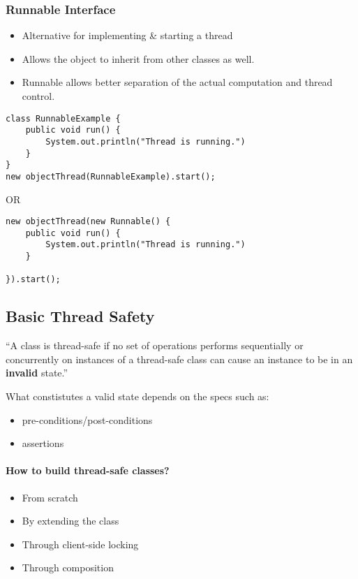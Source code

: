 \documentclass[a4paper]{article}
\begin{document}
\subsubsection{Runnable Interface}
\begin{itemize}
	\item Alternative for implementing \& starting a thread
	\item Allows the object to inherit from other classes as well.
	\item Runnable allows better separation of the actual computation and thread control.
\end{itemize}
\begin{verbatim}
class RunnableExample {
	public void run() {
		System.out.println("Thread is running.")
	}
}
new objectThread(RunnableExample).start();
\end{verbatim}
OR
\\
\begin{verbatim}
new objectThread(new Runnable() {
	public void run() {
		System.out.println("Thread is running.")
	}

}).start();
\end{verbatim}
\newpage
\subsection{Basic Thread Safety}
\begin{framed}
	\begin{displayquote}
		“A class is thread-safe if no set of operations performs sequentially or concurrently on instances of a thread-safe class can cause an instance to be in an \textbf{invalid} state.”
	\end{displayquote}
\end{framed}

What constistutes a valid state depends on the specs such as:
\begin{itemize}
	\item pre-conditions/post-conditions
	\item assertions
\end{itemize}
\paragraph{How to build thread-safe classes?}
\begin{itemize}
	\item From scratch
	\item By extending the class
	\item Through client-side locking
	\item Through composition
\end{itemize}
\end{document}
